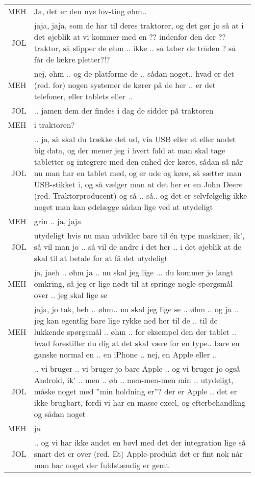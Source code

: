 \begin{longtable}{ r | p{13.5cm} }
    MEH & Ja, det er den nye lov-ting øhm.. \\
    JOL & jaja, jaja, som de har til deres traktorer, og det gør jo så at i det øjeblik at vi kommer med en {??} indenfor den der {??} traktor, så slipper de øhm .. ikke .. så taber de tråden {?} så får de {lækre pletter?!?} \\
    MEH & nej, øhm .. og de platforme de .. sådan noget.. hvad er det (red. for) nogen systemer de kører på de her .. er det telefoner, eller tablets eller .. \\
    JOL & .. jamen dem der findes i dag de sidder på traktoren \\
    MEH & i traktoren? \\
    JOL & .. ja, så skal du trække det ud, via USB eller et eller andet big data, og der mener jeg i hvert fald at man skal tage tabletter og integrere med den enhed der køres, sådan så når nu man har en tablet med, og er ude og køre, så sætter man USB-stikket i, og så vælger man at det her er en John Deere (red. Traktorproducent) og så .. så.. og det er selvfølgelig ikke noget man kan ødelægge sådan lige ved at {utydeligt}\\
    MEH & grin .. ja, jaja \\
    JOL & {utydeligt} hvis nu man udvikler bare til én type maskiner, ik’, så vil man jo .. så vil de andre i det her .. i det øjeblik at de skal til at betale for at få det {utydeligt} \\
    MEH & ja, jaeh .. øhm ja .. nu skal jeg lige ... du kommer jo langt omkring, så jeg er lige nødt til at springe nogle spørgsmål over .. jeg skal lige se \\
    MEH & jaja, jo tak, heh .. øhm.. nu skal jeg lige se .. øhm .. og ja .. jeg kan egentlig bare lige rykke ned her til de .. til de lukkende spørgsmål .. øhm .. for eksempel den der tablet .. hvad forestiller du dig at det skal være for en type.. bare en ganske normal en .. en iPhone .. nej, en Apple eller .. \\
    JOL & .. vi bruger .. vi bruger jo bare Apple .. og vi bruger jo også Android, ik’ .. men .. øh .. men-men-men min .. {utydeligt, måske noget med ”min holdning er”?} der er Apple .. det er ikke brugbart, fordi vi har en masse excel, og efterbehandling og sådan noget \\
    MEH & ja \\
    JOL & .. og vi har ikke andet en bøvl med det der integration lige så snart det er over (red. Et) Apple-produkt det er fint nok når man har noget der fuldstændig er gemt \\

\end{longtable}
